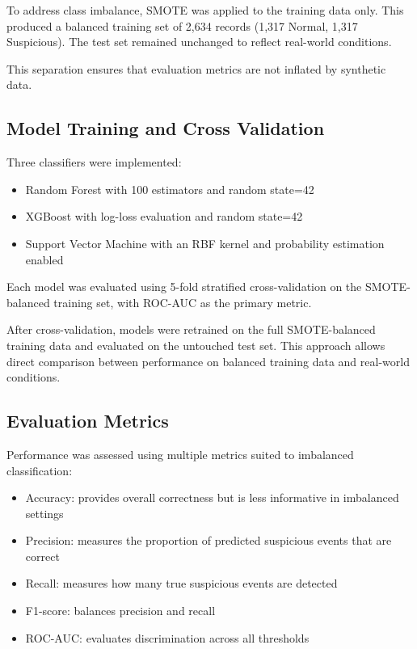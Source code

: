 To address class imbalance, SMOTE was applied to the training data only. This produced a balanced training set of 2,634 records (1,317 Normal, 1,317 Suspicious). The test set remained unchanged to reflect real-world conditions.

This separation ensures that evaluation metrics are not inflated by synthetic data.


\subsection{Model Training and Cross Validation}
Three classifiers were implemented:

\begin{itemize}
    \item Random Forest with 100 estimators and random state=42
    \item XGBoost with log-loss evaluation and random state=42
    \item Support Vector Machine with an RBF kernel and probability estimation enabled
\end{itemize}

Each model was evaluated using 5-fold stratified cross-validation on the SMOTE-balanced training set, with ROC-AUC as the primary metric.

After cross-validation, models were retrained on the full SMOTE-balanced training data and evaluated on the untouched test set. This approach allows direct comparison between performance on balanced training data and real-world conditions.


\subsection{Evaluation Metrics}
Performance was assessed using multiple metrics suited to imbalanced classification:

\begin{itemize}
    \item Accuracy: provides overall correctness but is less informative in imbalanced settings
    \item Precision: measures the proportion of predicted suspicious events that are correct
    \item Recall: measures how many true suspicious events are detected
    \item F1-score: balances precision and recall
    \item ROC-AUC: evaluates discrimination across all thresholds
\end{itemize}

